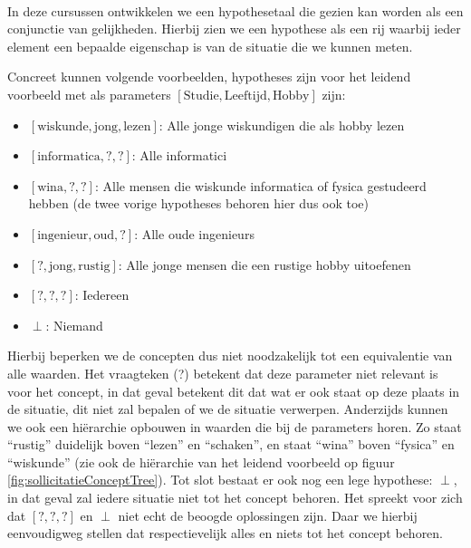 \paragraph{}
In deze cursussen ontwikkelen we een hypothesetaal die gezien kan worden als een conjunctie van gelijkheden. Hierbij zien we een hypothese als een rij waarbij ieder element een bepaalde eigenschap is van de situatie die we kunnen meten.
\begin{leftbar}
Concreet kunnen volgende voorbeelden, hypotheses zijn voor het leidend voorbeeld met als parameters $\left[\mbox{Studie}, \mbox{Leeftijd}, \mbox{Hobby}\right]$ zijn:
\begin{itemize}
 \item $\left[\mbox{wiskunde},\mbox{jong},\mbox{lezen}\right]$: Alle jonge wiskundigen die als hobby lezen
 \item $\left[\mbox{informatica},\mbox{?},\mbox{?}\right]$: Alle informatici
 \item $\left[\mbox{wina},\mbox{?},\mbox{?}\right]$: Alle mensen die wiskunde informatica of fysica gestudeerd hebben (de twee vorige hypotheses behoren hier dus ook toe)
 \item $\left[\mbox{ingenieur},\mbox{oud},\mbox{?}\right]$: Alle oude ingenieurs
 \item $\left[\mbox{?},\mbox{jong},\mbox{rustig}\right]$: Alle jonge mensen die een rustige hobby uitoefenen
 \item $\left[\mbox{?},\mbox{?},\mbox{?}\right]$: Iedereen
 \item $\perp$: Niemand
\end{itemize}
\end{leftbar}
Hierbij beperken we de concepten dus niet noodzakelijk tot een equivalentie van alle waarden. Het vraagteken (?) betekent dat deze parameter niet relevant is voor het concept, in dat geval betekent dit dat wat er ook staat op deze plaats in de situatie, dit niet zal bepalen of we de situatie verwerpen. Anderzijds kunnen we ook een hiërarchie opbouwen in waarden die bij de parameters horen. Zo staat ``rustig'' duidelijk boven ``lezen'' en ``schaken'', en staat ``wina'' boven ``fysica'' en ``wiskunde'' (zie ook de hiërarchie van het leidend voorbeeld op figuur \ref{fig:sollicitatieConceptTree}). Tot slot bestaat er ook nog een lege hypothese: $\perp$, in dat geval zal iedere situatie niet tot het concept behoren. Het spreekt voor zich dat $\left[\mbox{?},\mbox{?},\mbox{?}\right]$ en $\perp$ niet echt de beoogde oplossingen zijn. Daar we hierbij eenvoudigweg stellen dat respectievelijk alles en niets tot het concept behoren.
